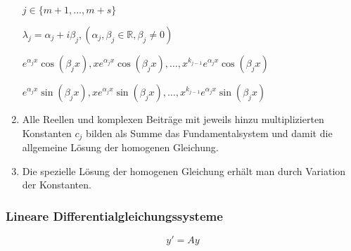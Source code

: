 \documentclass[twoside]{article}
\begin{document}
\begin{enumerate}[1.]
						\begin{math}
							j \in \{ m+1, \dots, m+s\}
						\end{math}
						
						\begin{math}
							\lambda_j = \alpha_j + i \beta_j, (\alpha_j, \beta_j \in \mathbb{R}, \beta_j \neq 0)
						\end{math}
						
						\begin{math}
							e^{\alpha_jx} \cos (\beta_jx), x e^{\alpha_jx} \cos (\beta_jx), \dots, x^{k_{j-1}} e^{\alpha_jx} \cos (\beta_jx)
						\end{math}
						
						\begin{math}
							e^{\alpha_jx} \sin (\beta_jx), x e^{\alpha_jx} \sin (\beta_jx), \dots, x^{k_{j-1}} e^{\alpha_jx} \sin (\beta_jx)
						\end{math}
						
					\item Alle Reellen und komplexen Beiträge mit jeweils hinzu multiplizierten Konstanten \begin{math} c_j \end{math} bilden als Summe das Fundamentalsystem und damit die allgemeine Lösung der homogenen Gleichung.
					
					\item Die spezielle Lösung der homogenen Gleichung erhält man durch Variation der Konstanten.
				\end{enumerate}
				
			\subsubsection{Lineare Differentialgleichungssysteme}
				
				\begin{displaymath}
					y' = Ay
				\end{displaymath}
				
\end{document}
